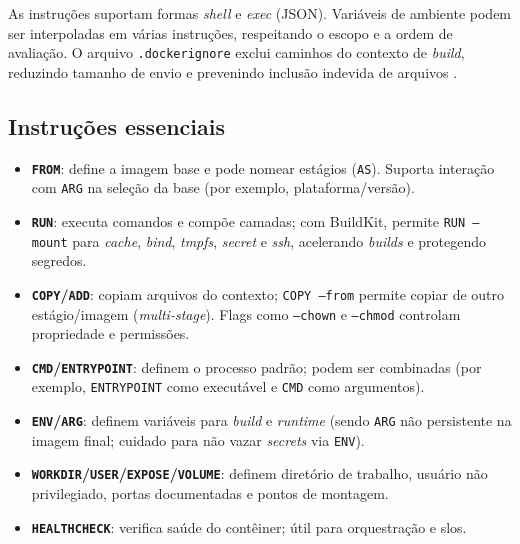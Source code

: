 As instruções suportam formas \textit{shell} e \textit{exec} (JSON). Variáveis de ambiente podem ser interpoladas em várias instruções, respeitando o escopo e a ordem de avaliação. O arquivo \texttt{.dockerignore} exclui caminhos do contexto de \textit{build}, reduzindo tamanho de envio e prevenindo inclusão indevida de arquivos \cite{dockerfile_ref}. 

\subsection{Instruções essenciais}
\label{subsec:dockerfile-core}

\begin{itemize}
    \item \textbf{\texttt{FROM}}: define a imagem base e pode nomear estágios (\texttt{AS}). Suporta interação com \texttt{ARG} na seleção da base (por exemplo, plataforma/versão). \cite{dockerfile_ref} 
    
    \item \textbf{\texttt{RUN}}: executa comandos e compõe camadas; com BuildKit, permite \texttt{RUN --mount} para \textit{cache}, \textit{bind}, \textit{tmpfs}, \textit{secret} e \textit{ssh}, acelerando \textit{builds} e protegendo segredos. \cite{dockerfile_ref} 
    \item \textbf{\texttt{COPY}/\texttt{ADD}}: copiam arquivos do contexto; \texttt{COPY --from} permite copiar de outro estágio/imagem (\textit{multi-stage}). Flags como \texttt{--chown} e \texttt{--chmod} controlam propriedade e permissões. \cite{dockerfile_ref}
    \item \textbf{\texttt{CMD}/\texttt{ENTRYPOINT}}: definem o processo padrão; podem ser combinadas (por exemplo, \texttt{ENTRYPOINT} como executável e \texttt{CMD} como argumentos). \cite{dockerfile_ref}
    \item \textbf{\texttt{ENV}/\texttt{ARG}}: definem variáveis para \textit{build} e \textit{runtime} (sendo \texttt{ARG} não persistente na imagem final; cuidado para não vazar \textit{secrets} via \texttt{ENV}). \cite{dockerfile_ref}
    \item \textbf{\texttt{WORKDIR}/\texttt{USER}/\texttt{EXPOSE}/\texttt{VOLUME}}: definem diretório de trabalho, usuário não privilegiado, portas documentadas e pontos de montagem. \cite{dockerfile_ref}
    \item \textbf{\texttt{HEALTHCHECK}}: verifica saúde do contêiner; útil para orquestração e \acrshort{slo}s. \cite{dockerfile_ref}
\end{itemize}

